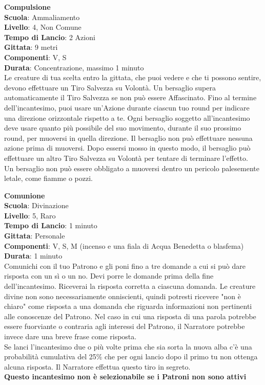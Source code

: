 \begin{multicols}{2}
\medskip\textbf{Compulsione}\\
\textbf{Scuola}: Ammaliamento\\
\textbf{Livello}: 4, Non Comune\\
\textbf{Tempo di Lancio}: 2 Azioni\\
\textbf{Gittata}: 9 metri\\
\textbf{Componenti}: V, S\\
\textbf{Durata}: Concentrazione, massimo 1 minuto\\
Le creature di tua scelta entro la gittata, che puoi vedere e che ti possono sentire, devono effettuare un Tiro Salvezza su Volontà. Un bersaglio supera automaticamente il Tiro Salvezza se non può essere Affascinato. Fino al termine dell'incantesimo, puoi usare un'Azione durante ciascun tuo round per indicare una direzione orizzontale rispetto a te. Ogni bersaglio soggetto all'incantesimo deve usare quanto più possibile del suo movimento, durante il suo prossimo round, per muoversi in quella direzione. Il bersaglio non può effettuare nessuna azione prima di muoversi. Dopo essersi mosso in questo modo, il bersaglio può effettuare un altro Tiro Salvezza su Volontà per tentare di terminare l'effetto.\\
Un bersaglio non può essere obbligato a muoversi dentro un pericolo palesemente letale, come fiamme o pozzi.

\medskip\textbf{Comunione}\\
\textbf{Scuola}: Divinazione\\
\textbf{Livello}: 5, Raro\\
\textbf{Tempo di Lancio}: 1 minuto\\
\textbf{Gittata}: Personale\\
\textbf{Componenti}: V, S, M (incenso e una fiala di Acqua Benedetta o blasfema)\\
\textbf{Durata}: 1 minuto\\
Comunichi con il tuo Patrono e gli poni fino a tre domande a cui si può dare risposta con un sì o un no. Devi porre le domande prima della fine dell'incantesimo. Riceverai la risposta corretta a ciascuna domanda. Le creature divine non sono necessariamente onniscienti, quindi potresti ricevere "non è chiaro" come risposta a una domanda che riguarda informazioni non pertinenti alle conoscenze del Patrono. Nel caso in cui una risposta di una parola potrebbe essere fuorviante o contraria agli interessi del Patrono, il Narratore potrebbe invece dare una breve frase come risposta.\\
Se lanci l'incantesimo due o più volte prima che sia sorta la nuova alba c'è una probabilità cumulativa del 25\% che per ogni lancio dopo il primo tu non ottenga alcuna risposta. Il Narratore effettua questo tiro in segreto.\\
\textbf{Questo incantesimo non è selezionabile se i Patroni non sono attivi}


\end{multicols}
